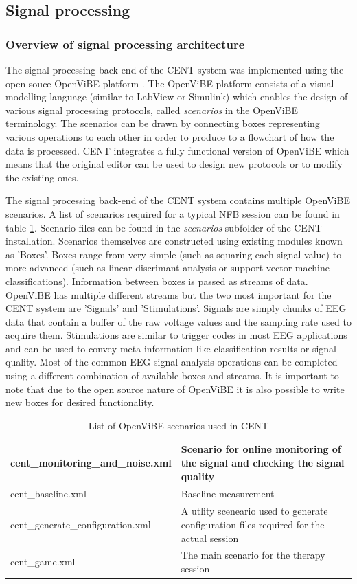 \subsection{Signal processing}

\subsubsection{Overview of signal processing architecture}
The signal processing back-end of the CENT system was implemented using the open-souce OpenViBE platform \cite{renard2010openvibe}. The OpenViBE platform consists of a visual modelling language (similar to LabView or Simulink) which enables the design of various signal processing protocols, called \textit{scenarios} in the OpenViBE terminology. The scenarios can be drawn by connecting boxes representing various operations to each other in order to produce to a flowchart of how the data is processed. CENT integrates a fully functional version of OpenViBE which means that the original editor can be used to design new protocols or to modify the existing ones.

The signal processing back-end of the CENT system contains multiple OpenViBE scenarios. A list of scenarios required for a typical NFB session can be found in table \ref{scenariolist}. Scenario-files can be found in the \textit{scenarios} subfolder of the CENT installation. Scenarios themselves are constructed using existing modules known as 'Boxes'. Boxes range from very simple (such as squaring each signal value) to more advanced (such as linear discrimant analysis or support vector machine classifications). Information between boxes is passed as streams of data. OpenViBE has multiple different streams but the two most important for the CENT system are 'Signals' and 'Stimulations'. Signals are simply chunks of EEG data that contain a buffer of the raw voltage values and the sampling rate used to acquire them. Stimulations are similar to trigger codes in most EEG applications and can be used to convey meta information like classification results or signal quality. Most of the common EEG signal analysis operations can be completed using a different combination of available boxes and streams. It is important to note that due to the open source nature of OpenViBE it is also possible to write new boxes for desired functionality.

\begin{table}[h]
\centering
\begin{tabular}{ll}
	\hline
	cent\_monitoring\_and\_noise.xml & Scenario for online monitoring of the 
	signal and checking the signal quality \\
	\hline
	cent\_baseline.xml & Baseline measurement \\
	\hline
	cent\_generate\_configuration.xml & A utlity sceneario used to generate configuration files required for the actual session \\
	\hline
	cent\_game.xml & The main scenario for the therapy session \\
	\hline
\end{tabular}
    \caption{List of OpenViBE scenarios used in CENT}\label{scenariolist}
\end{table}

